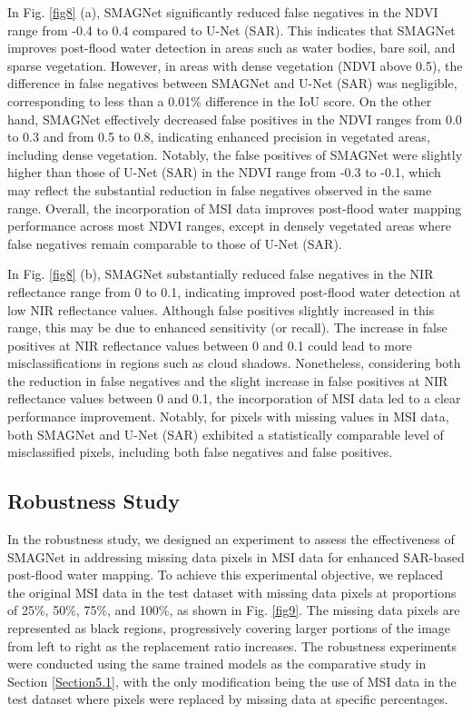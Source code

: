 \documentclass[preprint,12pt,authoryear]{elsarticle}
\begin{document}
In Fig. \ref{fig8} (a), SMAGNet significantly reduced false negatives in the NDVI range from -0.4 to 0.4 compared to U-Net (SAR). This indicates that SMAGNet improves post-flood water detection in areas such as water bodies, bare soil, and sparse vegetation. However, in areas with dense vegetation (NDVI above 0.5), the difference in false negatives between SMAGNet and U-Net (SAR) was negligible, corresponding to less than a 0.01\% difference in the IoU score. On the other hand, SMAGNet effectively decreased false positives in the NDVI ranges from 0.0 to 0.3 and from 0.5 to 0.8, indicating enhanced precision in vegetated areas, including dense vegetation. Notably, the false positives of SMAGNet were slightly higher than those of U-Net (SAR) in the NDVI range from -0.3 to -0.1, which may reflect the substantial reduction in false negatives observed in the same range. Overall, the incorporation of MSI data improves post-flood water mapping performance across most NDVI ranges, except in densely vegetated areas where false negatives remain comparable to those of U-Net (SAR).

In Fig. \ref{fig8} (b), SMAGNet substantially reduced false negatives in the NIR reflectance range from 0 to 0.1, indicating improved post-flood water detection at low NIR reflectance values. Although false positives slightly increased in this range, this may be due to enhanced sensitivity (or recall). The increase in false positives at NIR reflectance values between 0 and 0.1 could lead to more misclassifications in regions such as cloud shadows. Nonetheless, considering both the reduction in false negatives and the slight increase in false positives at NIR reflectance values between 0 and 0.1, the incorporation of MSI data led to a clear performance improvement. Notably, for pixels with missing values in MSI data, both SMAGNet and U-Net (SAR) exhibited a statistically comparable level of misclassified pixels, including both false negatives and false positives.


\subsection{Robustness Study}
\label{Section5.2}

In the robustness study, we designed an experiment to assess the effectiveness of SMAGNet in addressing missing data pixels in MSI data for enhanced SAR-based post-flood water mapping. To achieve this experimental objective, we replaced the original MSI data in the test dataset with missing data pixels at proportions of 25\%, 50\%, 75\%, and 100\%, as shown in Fig. \ref{fig9}. The missing data pixels are represented as black regions, progressively covering larger portions of the image from left to right as the replacement ratio increases. The robustness experiments were conducted using the same trained models as the comparative study in Section \ref{Section5.1}, with the only modification being the use of MSI data in the test dataset where pixels were replaced by missing data at specific percentages.
\end{document}
